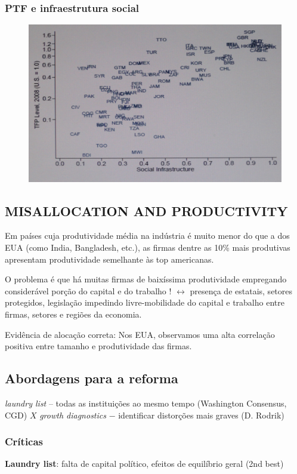 \documentclass[a4paper,12pt]{article}[abntex2]
\begin{document}
\subsubsection{\textbf{PTF e infraestrutura social}}

\begin{figure}[H]
    \centering
    \includegraphics[width=0.7\linewidth]{Imagens/a16i4.png}
\end{figure}

\subsection{\textbf{MISALLOCATION AND PRODUCTIVITY}}
Em países cuja produtividade média na indústria é muito menor do que a dos EUA (como India, Bangladesh, etc.), as firmas dentre as 10\% mais produtivas apresentam produtividade semelhante às top americanas.

O problema é que há muitas firmas de baixíssima produtividade empregando considerável porção do capital e do trabalho ! \(\leftrightarrow\) presença de estatais, setores protegidos, legislação impedindo livre-mobilidade do capital e trabalho entre firmas, setores e regiões da economia.

Evidência de alocação correta: Nos EUA, observamos uma alta correlação positiva entre tamanho e produtividade das firmas.

\subsection{\textbf{Abordagens para a reforma}}
\textit{laundry list} – todas as instituições ao mesmo tempo (Washington Consensus, CGD) \(X\) \textit{growth diagnostics} − identificar distorções mais graves (D. Rodrik)

\subsubsection{\textbf{Críticas}}
\textbf{Laundry list}: falta de capital político, efeitos de equilíbrio geral (2nd best)
\end{document}
